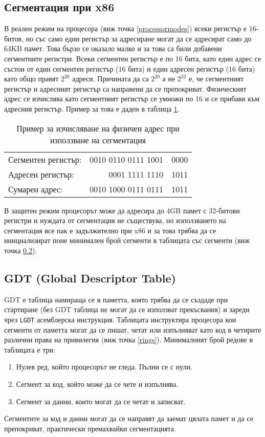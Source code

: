   \subsection{Сегментация при x86} \label{segmentation}
  В реален режим на процесора (виж точка \ref{processormodes}) всеки регистър е 16-битов, но със само един регистър за адресиране могат да се адресират само до 64KB памет. Това бързо се оказало малко и за това са били добавени сегментните регистри. Всеки сегментен регистър е по 16 бита, като един адрес се състои от един сегментен регистър (16 бита) и един адресен регистър (16 бита) като общо правят $2^{20}$ адреси. Причината да са $2^{20}$ а не $2^{32}$ е, че сегментният регистър и адресният регистър са направени да се препокриват. Физическият адрес се изчислява като сегментният регистър се умножи по 16 и се прибави към адресния регистър. Пример за това е даден в таблица \ref{tab:segmentation-calculation}.
  \begin{table}[ht]
    \centering
    \begin{tabular}{l r@{\hskip 3pt}l}
      Сегментен регистър: & 0010 0110 0111 1001 & \color{gray}0000 \\
      Адресен регистър: & 0001 1111 1110 & 1011 \\
      \hline
      Сумарен адрес: & 0010 1000 0111 0111 & 1011 \\
    \end{tabular}
    \caption{Пример за изчисляване на физичен адрес при използване на сегментация}
    \label{tab:segmentation-calculation}
  \end{table}

  В защитен режим процесорът може да адресира до 4GB памет с 32-битови регистри и нуждата от сегментация не съществува, но използването на сегментация все пак е задължително при x86 и за това трябва да се инициализират поне минимален брой сегменти в таблицата със сегменти (виж точка \ref{gdt}).

  \subsection{GDT (Global Descriptor Table)} \label{gdt}
  GDT е таблица намираща се в паметта, която трябва да се създаде при стартиране (без GDT таблица не могат да се използват прекъсвания) и зареди чрез {\tt LGDT} асемблерска инструкция. Таблицата инструктира процесора кои сегменти от паметта могат да се пишат, четат или изпълняват като код в четирите различни права на привилегия (виж точка \ref{rings}). Минималният брой редове в таблицата е три:
  \begin{enumerate}
    \item Нулев ред, който процесорът не гледа. Пълни се с нули.
    \item Сегмент за код, който може да се чете и изпълнява.
    \item Сегмент за данни, които могат да се четат и записват.
  \end{enumerate}
  Сегментите за код и данни могат да се направят да заемат цялата памет и да се препокриват, практически премахвайки сегментацията.

